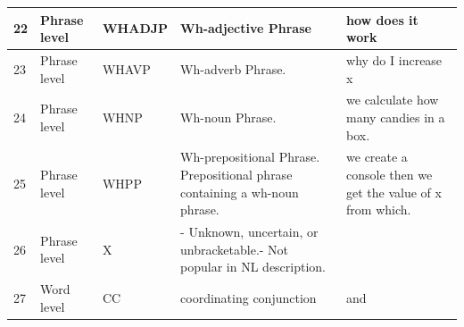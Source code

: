 \begin{longtable}{|p{}|p{}|p{}|p{}|p{}|}
		\rowcolor[HTML]{9AFF99} 
		22                                                        & Phrase level                                                & WHADJP                                                     & Wh-adjective Phrase                                                                                             & how does it work                                                                \\ \hline
		\rowcolor[HTML]{9AFF99} 
		23                                                        & Phrase level                                                & WHAVP                                                      & Wh-adverb Phrase.                                                                                               & why do I increase x                                                             \\ \hline
		\rowcolor[HTML]{9AFF99} 
		24                                                        & Phrase level                                                & WHNP                                                       & Wh-noun Phrase.                                                                                                 & we calculate how many candies in a box.                                         \\ \hline
		\rowcolor[HTML]{9AFF99} 
		25                                                        & Phrase level                                                & WHPP                                                       & Wh-prepositional Phrase. Prepositional phrase containing a wh-noun phrase.                                      & we create a console then we get the value of x from which.                      \\ \hline
		\rowcolor[HTML]{FFFFC7} 
		26                                                        & Phrase level                                                & X                                                          & - Unknown, uncertain, or unbracketable.- Not popular in NL description.                                         &                                                                                 \\ \hline
		\rowcolor[HTML]{FFCCC9} 
		27                                                        & Word level                                                  & CC                                                         & coordinating conjunction                                                                                        & and                                                                             \\ \hline

\end{longtable}
